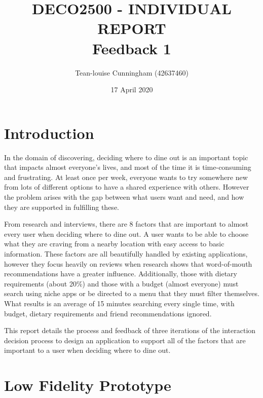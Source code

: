 \documentclass[a4 paper, 12pt]{article}
\title{DECO2500 - INDIVIDUAL REPORT \\ Feedback 1}
\author{Tean-louise Cunningham (42637460)}
\date{17 April 2020}
\begin{document}
\maketitle

\pagebreak
\tableofcontents

\pagebreak
\section{Introduction}
In the domain of discovering, deciding where to dine out is an important topic that impacts almost everyone’s lives, and most of the time it is time-consuming and frustrating. At least once per week, everyone wants to try somewhere new from lots of different options to have a shared experience with others. However the problem arises with the gap between what users want and need, and how they are supported in fulfilling these. 

From research and interviews, there are 8 factors that are important to almost every user when deciding where to dine out. A user wants to be able to choose what they are craving from a nearby location with easy access to basic information. These factors are all beautifully handled by existing applications, however they focus heavily on reviews when research shows that word-of-mouth recommendations have a greater influence. Additionally, those with dietary requirements (about 20\%) and those with a budget (almost everyone) must search using niche apps or be directed to a menu that they must filter themselves. What results is an average of 15 minutes searching every single time, with budget, dietary requirements and friend recommendations ignored.

This report details the process and feedback of three iterations of the interaction decision process to design an application to support all of the factors that are important to a user when deciding where to dine out. 







\appendix
\addappheadtotoc

\pagebreak
\appendixpage
\section{Low Fidelity Prototype}
\end{document}
